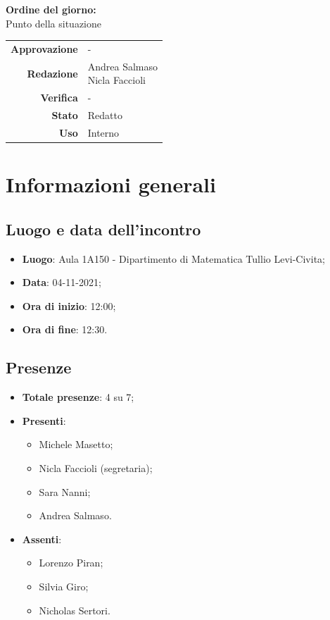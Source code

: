 \documentclass[11pt]{article}
\begin{document}
\begin{titlepage}
\begin{center}
			\large
			
			\vfill
			\textbf{Ordine del giorno:} \\
			Punto della situazione
			
			
			\vfill
			
			
			\begin{tabular}{r|l}
				\textbf{Approvazione} &  -\\
				\textbf{Redazione} &  \parbox[t]{5cm}{Andrea Salmaso \\Nicla Faccioli}\\
				\textbf{Verifica} &  -\\
				\textbf{Stato} & Redatto \\
				\textbf{Uso} & Interno
			\end{tabular}
			\vfill
			
		\end{center}
	\end{titlepage}

	\section{Informazioni generali}
	\subsection{Luogo e data dell'incontro}
	\begin{itemize}
		\item \textbf{Luogo}: Aula 1A150 - Dipartimento di Matematica Tullio Levi-Civita;
		\item \textbf{Data}: 04-11-2021;
		\item \textbf{Ora di inizio}: 12:00;
		\item \textbf{Ora di fine}: 12:30.
	\end{itemize}
	
	\subsection{Presenze}
	\begin{itemize}
		\item \textbf{Totale presenze}: 4 su 7;
		\item \textbf{Presenti}:
		\begin{itemize}  
			\item Michele Masetto;
			\item Nicla Faccioli (segretaria);
			\item Sara Nanni;
			\item Andrea Salmaso.
		\end{itemize}
		\item \textbf{Assenti}:
			\begin{itemize}
				\item Lorenzo Piran;
				\item Silvia Giro;
				\item Nicholas Sertori.
			\end{itemize}
	\end{itemize}
\end{document}
